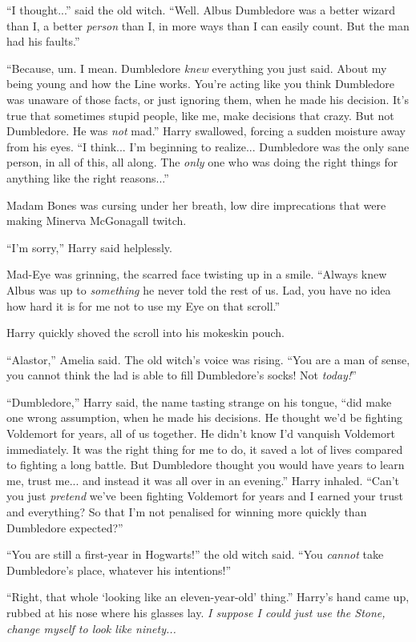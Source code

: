 ``I thought...'' said the old witch. ``Well. Albus Dumbledore was a better wizard than I, a better \emph{person} than I, in more ways than I can easily count. But the man had his faults.''

``Because, um. I mean. Dumbledore \emph{knew} everything you just said. About my being young and how the Line works. You're acting like you think Dumbledore was unaware of those facts, or just ignoring them, when he made his decision. It's true that sometimes stupid people, like me, make decisions that crazy. But not Dumbledore. He was \emph{not} mad.'' Harry swallowed, forcing a sudden moisture away from his eyes. ``I think... I'm beginning to realize... Dumbledore was the only sane person, in all of this, all along. The \emph{only} one who was doing the right things for anything like the right reasons...''

Madam Bones was cursing under her breath, low dire imprecations that were making Minerva McGonagall twitch.

``I'm sorry,'' Harry said helplessly.

Mad-Eye was grinning, the scarred face twisting up in a smile. ``Always knew Albus was up to \emph{something} he never told the rest of us. Lad, you have no idea how hard it is for me not to use my Eye on that scroll.''

Harry quickly shoved the scroll into his mokeskin pouch.

``Alastor,'' Amelia said. The old witch's voice was rising. ``You are a man of sense, you cannot think the lad is able to fill Dumbledore's socks! Not \emph{today!}''

``Dumbledore,'' Harry said, the name tasting strange on his tongue, ``did make one wrong assumption, when he made his decisions. He thought we'd be fighting Voldemort for years, all of us together. He didn't know I'd vanquish Voldemort immediately. It was the right thing for me to do, it saved a lot of lives compared to fighting a long battle. But Dumbledore thought you would have years to learn me, trust me... and instead it was all over in an evening.'' Harry inhaled. ``Can't you just \emph{pretend} we've been fighting Voldemort for years and I earned your trust and everything? So that I'm not penalised for winning more quickly than Dumbledore expected?''

``You are still a first-year in Hogwarts!'' the old witch said. ``You \emph{cannot} take Dumbledore's place, whatever his intentions!''

``Right, that whole `looking like an eleven-year-old' thing.'' Harry's hand came up, rubbed at his nose where his glasses lay. \emph{I suppose I could just use the Stone, change myself to look like ninety...}

